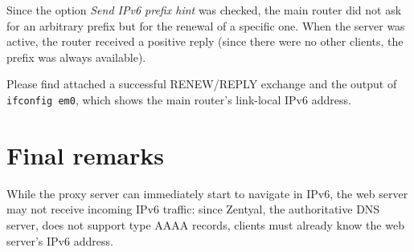 \documentclass{homework}
\newcommand{\ip}{IPv6\xspace}
\begin{document}
    Since the option \textit{Send \ip prefix hint} was checked, the main router did not ask for an arbitrary prefix but for the renewal of a specific one.
    When the server was active, the router received a positive reply (since there were no other clients, the prefix was always available).
    
    Please find attached a successful RENEW/REPLY exchange and the output of \texttt{ifconfig em0}, which shows the main router's link-local \ip address.
    
    
    \section{Final remarks}
    While the proxy server can immediately start to navigate in \ip, the web server may not receive incoming \ip traffic: since Zentyal, the authoritative DNS server, does not support type AAAA records, clients must already know the web server's \ip address.
\end{document}
